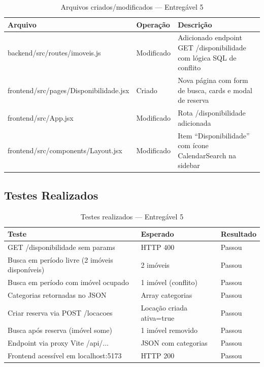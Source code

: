 \documentclass[12pt, a4paper]{article}
\newcommand{\thead}[1]{\cellcolor{tableheader}\color{white}\bfseries #1}
\newcommand{\talt}{\rowcolor{tablerowalt}}
\begin{document}
\begin{table}[H]
\centering
\begin{tabularx}{\textwidth}{|l|l|X|}
\hline
\thead{Arquivo} & \thead{Operação} & \thead{Descrição} \\
\hline
backend/src/routes/imoveis.js           & Modificado & Adicionado endpoint GET /disponibilidade com lógica SQL de conflito \\
\talt frontend/src/pages/Disponibilidade.jsx & Criado     & Nova página com form de busca, cards e modal de reserva \\
frontend/src/App.jsx                    & Modificado & Rota /disponibilidade adicionada \\
\talt frontend/src/components/Layout.jsx    & Modificado & Item ``Disponibilidade'' com ícone CalendarSearch na sidebar \\
\hline
\end{tabularx}
\caption{Arquivos criados/modificados — Entregável 5}
\end{table}

\subsection{Testes Realizados}

\begin{table}[H]
\centering
\begin{tabularx}{\textwidth}{|X|l|l|}
\hline
\thead{Teste} & \thead{Esperado} & \thead{Resultado} \\
\hline
GET /disponibilidade sem params          & HTTP 400              & Passou \\
\talt Busca em período livre (2 imóveis disponíveis) & 2 imóveis   & Passou \\
Busca em período com imóvel ocupado     & 1 imóvel (conflito)   & Passou \\
\talt Categorias retornadas no JSON          & Array categorias      & Passou \\
Criar reserva via POST /locacoes        & Locação criada ativa=true & Passou \\
\talt Busca após reserva (imóvel some)       & 1 imóvel removido     & Passou \\
Endpoint via proxy Vite /api/...        & JSON com categorias   & Passou \\
\talt Frontend acessível em localhost:5173   & HTTP 200              & Passou \\
\hline
\end{tabularx}
\caption{Testes realizados — Entregável 5}
\end{table}
\end{document}
